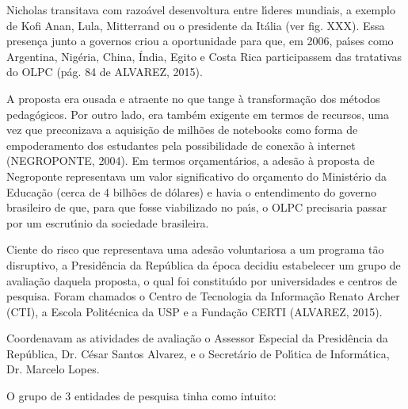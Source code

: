 \documentclass[
12pt,		%
openright,	%
twoside,  %
a4paper,			%
chapter=TITLE,		%
english,			%
french,				%
spanish,			%
brazil				%
]{USPSC-classe/USPSC}
\begin{document}
Nicholas transitava com razo\'avel desenvoltura entre l\'{\i}deres mundiais, a exemplo de Kofi Anan, Lula, Mitterrand ou o presidente da It\'alia (ver fig. XXX). Essa presen\c{c}a junto a governos criou a oportunidade para que, em 2006, pa\'{\i}ses como Argentina, Nig\'eria, China, \'India, Egito e Costa Rica participassem das tratativas do OLPC  (p\'ag. 84 de ALVAREZ, 2015).









A proposta era ousada e atraente no que tange \`a transforma\c{c}\~ao dos m\'etodos pedag\'ogicos. Por outro lado, era tamb\'em exigente em termos de recursos, uma vez que preconizava a aquisi\c{c}\~ao de milh\~oes de notebooks como forma de empoderamento dos estudantes pela possibilidade de conex\~ao \`a internet  (NEGROPONTE, 2004). Em termos or\c{c}ament\'arios, a ades\~ao \`a proposta de Negroponte representava um valor significativo do or\c{c}amento do Minist\'erio da Educa\c{c}\~ao (cerca de 4 bilh\~oes de d\'olares) e havia o entendimento do governo brasileiro de que, para que fosse viabilizado no pa\'{\i}s, o OLPC precisaria passar por um escrut\'{\i}nio da sociedade brasileira.









Ciente do risco que representava uma ades\~ao voluntariosa a um programa t\~ao disruptivo, a Presid\^encia da Rep\'ublica da \'epoca decidiu estabelecer um grupo de avalia\c{c}\~ao  daquela proposta, o  qual foi constitu\'{\i}do por universidades e centros de pesquisa. Foram chamados o Centro de Tecnologia da Informa\c{c}\~ao Renato Archer (CTI), a Escola Polit\'ecnica da USP e a Funda\c{c}\~ao CERTI (ALVAREZ, 2015).









Coordenavam as atividades de avalia\c{c}\~ao o Assessor Especial da Presid\^encia da Rep\'ublica, Dr. C\'esar Santos Alvarez, e o Secret\'ario de Pol\'{\i}tica de Inform\'atica, Dr. Marcelo Lopes.









O grupo de 3 entidades de pesquisa tinha como intuito:
\end{document}
